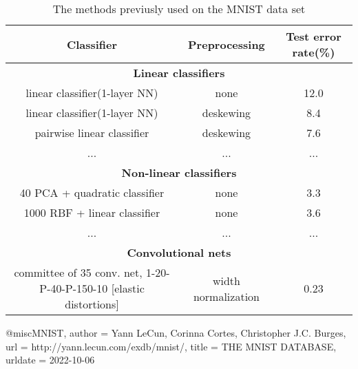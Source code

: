 \begin{table}[h]
    \centering
    \resizebox{1\textwidth}{!}
    {
    \begin{tabular}{|c|c|c|}
        \hline
        Classifier & Preprocessing & Test error rate(\%)\\
        \hline
        \multicolumn{3}{|c|}{\textbf{Linear classifiers}} \\
        \hline
        linear classifier(1-layer NN) & none & 12.0 \\
        linear classifier(1-layer NN) & deskewing & 8.4 \\
        pairwise linear classifier & deskewing & 7.6 \\
        \hline
        ... & ... & ... \\ 
        \hline
        \multicolumn{3}{|c|}{\textbf{Non-linear classifiers}} \\
        \hline
        40 PCA + quadratic classifier & none & 3.3 \\
        1000 RBF + linear classifier & none & 3.6 \\
        \hline
        ... & ... & ... \\ 
        \hline
        \multicolumn{3}{|c|}{\textbf{Convolutional nets}} \\
        \hline
        committee of 35 conv. net, 1-20-P-40-P-150-10 [elastic distortions] & width normalization & 0.23 \\
        \hline
    \end{tabular}
    }
    \caption{The methods previusly used on the MNIST data set}
    \label{tab:method-MNIST}
\end{table}






@misc{MNIST,
  author = {Yann LeCun, Corinna Cortes, Christopher J.C. Burges},
  url          = {http://yann.lecun.com/exdb/mnist/},
  title        = {THE MNIST DATABASE},
  urldate      = {2022-10-06}
}
